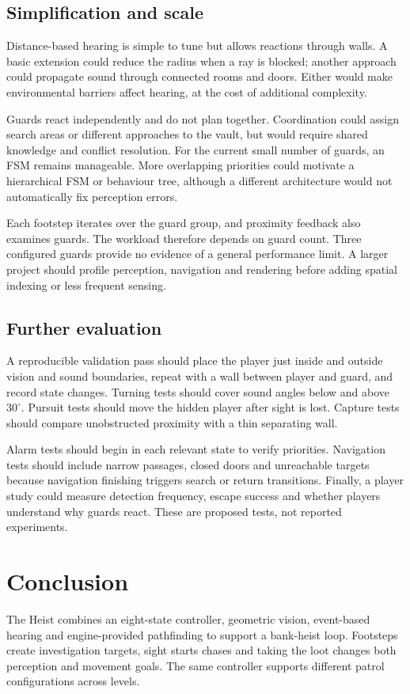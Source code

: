 \documentclass[fleqn,10pt]{SelfArx}
\begin{document}
\subsection{Simplification and scale}
Distance-based hearing is simple to tune but allows reactions through walls. A basic extension could reduce the radius when a ray is blocked; another approach could propagate sound through connected rooms and doors. Either would make environmental barriers affect hearing, at the cost of additional complexity.

Guards react independently and do not plan together. Coordination could assign search areas or different approaches to the vault, but would require shared knowledge and conflict resolution. For the current small number of guards, an FSM remains manageable. More overlapping priorities could motivate a hierarchical FSM or behaviour tree, although a different architecture would not automatically fix perception errors.

Each footstep iterates over the guard group, and proximity feedback also examines guards. The workload therefore depends on guard count. Three configured guards provide no evidence of a general performance limit. A larger project should profile perception, navigation and rendering before adding spatial indexing or less frequent sensing.

\subsection{Further evaluation}
A reproducible validation pass should place the player just inside and outside vision and sound boundaries, repeat with a wall between player and guard, and record state changes. Turning tests should cover sound angles below and above $30^{\circ}$. Pursuit tests should move the hidden player after sight is lost. Capture tests should compare unobstructed proximity with a thin separating wall.

Alarm tests should begin in each relevant state to verify priorities. Navigation tests should include narrow passages, closed doors and unreachable targets because navigation finishing triggers search or return transitions. Finally, a player study could measure detection frequency, escape success and whether players understand why guards react. These are proposed tests, not reported experiments.

\section{Conclusion}
The Heist combines an eight-state controller, geometric vision, event-based hearing and engine-provided pathfinding to support a bank-heist loop. Footsteps create investigation targets, sight starts chases and taking the loot changes both perception and movement goals. The same controller supports different patrol configurations across levels.
\end{document}
